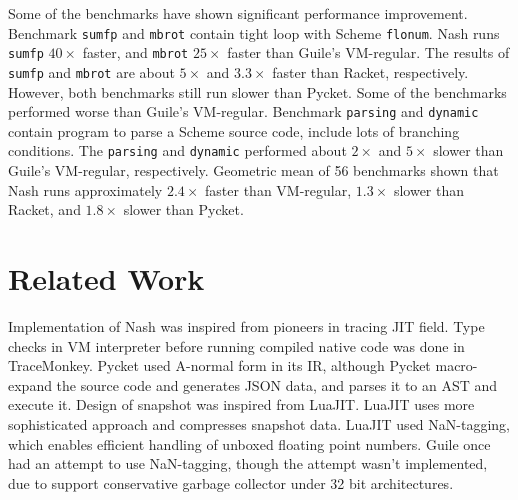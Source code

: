 \documentclass[preprint, numbers]{sigplanconf}
\begin{document}
Some of the benchmarks have shown significant performance
improvement. Benchmark \texttt{sumfp} and \texttt{mbrot} contain tight loop
with Scheme \texttt{flonum}. Nash runs \texttt{sumfp} $40\times$ faster, and
\texttt{mbrot} $25\times$ faster than Guile's VM-regular. The results of
\texttt{sumfp} and \texttt{mbrot} are about $5\times$ and $3.3\times$ faster
than Racket, respectively. However, both benchmarks still run slower than
Pycket. Some of the benchmarks performed worse than Guile's
VM-regular. Benchmark \texttt{parsing} and \texttt{dynamic} contain program to
parse a Scheme source code, include lots of branching conditions. The
\texttt{parsing} and \texttt{dynamic} performed about $2\times$ and $5\times$
slower than Guile's VM-regular, respectively. Geometric mean of 56 benchmarks
shown that Nash runs approximately $2.4\times$ faster than VM-regular,
$1.3\times$ slower than Racket, and $1.8\times$ slower than Pycket.


\section{Related Work}
\label{sec:related}
Implementation of Nash was inspired from pioneers in tracing JIT field. Type
checks in VM interpreter before running compiled native code was done in
TraceMonkey\cite{gal2009trace}. Pycket\cite{bauman2015pycket} used A-normal
form in its IR, although Pycket macro-expand the source code and generates
JSON data, and parses it to an AST and execute it. Design of snapshot was
inspired from LuaJIT\cite{pall2009ip}. LuaJIT uses more sophisticated
approach and compresses snapshot data. LuaJIT used NaN-tagging, which enables
efficient handling of unboxed floating point numbers. Guile once had an
attempt to use NaN-tagging, though the attempt wasn't implemented, due to
support conservative garbage collector under 32 bit
architectures\cite{value2011wingo}.
\end{document}
